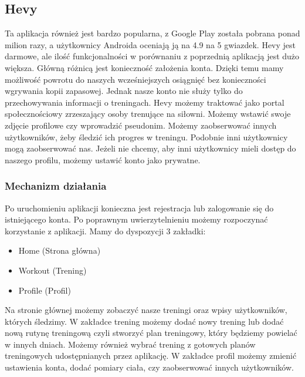 \documentclass{article}
\begin{document}
      \subsection{Hevy}
            Ta aplikacja również jest bardzo popularna, z Google Play została pobrana ponad milion razy, a użytkownicy Androida oceniają ją na 4.9 na 5 gwiazdek. Hevy jest darmowe, ale ilość funkcjonalności w porównaniu z poprzednią aplikacją jest dużo większa. Główną różnicą jest konieczność założenia konta. Dzięki temu mamy możliwość powrotu do naszych wcześniejszych osiągnięć bez konieczności wgrywania kopii zapasowej. Jednak nasze konto nie służy tylko do przechowywania informacji o treningach. Hevy możemy traktować jako portal społecznościowy zrzeszający osoby trenujące na siłowni. Możemy wstawić swoje zdjęcie profilowe czy wprowadzić pseudonim. Możemy zaobserwować innych użytkowników, żeby śledzić ich progres w treningu. Podobnie inni użytkownicy mogą zaobserwować nas. Jeżeli nie chcemy, aby inni użytkownicy mieli dostęp do naszego profilu, możemy ustawić konto jako prywatne.
            \subsubsection*{Mechanizm działania}
            Po uruchomieniu aplikacji konieczna jest rejestracja lub zalogowanie się do istniejącego konta. Po poprawnym uwierzytelnieniu możemy rozpoczynać korzystanie z aplikacji. Mamy do dyspozycji 3 zakładki:
            \begin{itemize}
                  \item Home (Strona główna)
                  \item Workout (Trening)
                  \item Profile (Profil)
            \end{itemize}
            Na stronie głównej możemy zobaczyć nasze treningi oraz wpisy użytkowników, których śledzimy. W zakładce trening możemy dodać nowy trening lub dodać nową rutynę treningową czyli stworzyć plan treningowy, który będziemy powielać w innych dniach. Możemy również wybrać trening z gotowych planów treningowych udostępnianych przez aplikację. W zakładce profil możemy zmienić ustawienia konta, dodać pomiary ciała, czy zaobserwować innych użytkowników.
\end{document}
